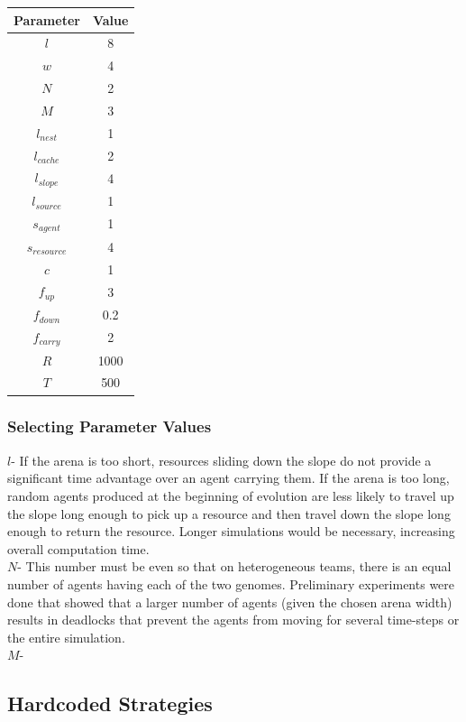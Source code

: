 \documentclass[12pt]{article}  %
\begin{document}
\begin{center}
\begin{tabular}{ |c|c| } 
 \hline
 Parameter & Value  \\ 
 \hline
 \hline
 $l$ & 8  \\ 
 \hline
 $w$ & 4  \\ 
 \hline
 $N$ & 2  \\ 
 \hline
 $M$ & 3  \\ 
 \hline
 $l_{nest}$ & 1  \\ 
 \hline
 $l_{cache}$ & 2  \\ 
 \hline
 $l_{slope}$ & 4  \\ 
 \hline
 $l_{source}$ & 1  \\ 
 \hline
 $s_{agent}$ & 1  \\ 
 \hline
 $s_{resource}$ & 4  \\ 
 \hline
 $c$ & 1  \\ 
 \hline
 $f_{up}$ & 3  \\ 
 \hline
 $f_{down}$ & 0.2  \\ 
 \hline
 $f_{carry}$ & 2  \\ 
 \hline
 $R$ & 1000  \\ 
 \hline
 $T$ & 500  \\ 
 \hline
 
\end{tabular}
\end{center}

\subsubsection{Selecting Parameter Values}

$l$- If the arena is too short, resources sliding down the slope do not provide a significant time advantage over an agent carrying them. If the arena is too long, random agents produced at the beginning of evolution are less likely to travel up the slope long enough to pick up a resource and then travel down the slope long enough to return the resource. Longer simulations would be necessary, increasing overall computation time. \\

$N$- This number must be even so that on heterogeneous teams, there is an equal number of agents having each of the two genomes. Preliminary experiments were done that showed that a larger number of agents (given the chosen arena width) results in deadlocks that prevent the agents from moving for several time-steps or the entire simulation.\\

$M$- \\

\subsection{Hardcoded Strategies}
\end{document}
